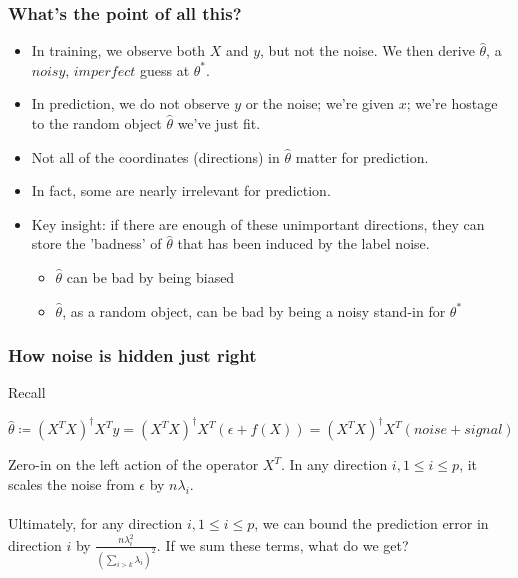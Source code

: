 \documentclass[pdf]{beamer}
\begin{document}
\begin{frame}

\frametitle{What's the point of all this?}

\begin{itemize}
    \item In training, we observe both $X$ and $y$, but not the noise.  We then derive $\hat\theta$, a $\textit{noisy, imperfect}$ guess at $\theta^{*}$.
    \item In prediction, we do not observe $y$ or the noise; we're given $x$; we're hostage to the random object $\hat\theta$ we've just fit.
\end{itemize}


\begin{itemize}
    \item<3-8> Not all of the coordinates (directions) in $\hat\theta$ matter for prediction.  
    \item<4-8> In fact, some are nearly irrelevant for prediction.  
    \item <5-8> Key insight: if there are enough of these unimportant directions, they can store the 'badness' of $\hat\theta$ that has been induced by the label noise.
    \begin{itemize}
        \item<6-8> $\hat\theta$ can be bad by being biased
        \item<7-8> $\hat\theta$, as a random object, can be bad by being a noisy stand-in for $\theta^{*}$
    \end{itemize}
\end{itemize}




\end{frame}


\begin{frame}
\frametitle{How noise is hidden just right}

Recall

\[ \hat\theta \coloneqq (X^{T}X)^{\dagger}X^{T}y =  (X^{T}X)^{\dagger}X^{T}(\epsilon + f(X)) = (X^{T}X)^{\dagger}X^{T}(noise + signal)\]

Zero-in on the left action of the operator $X^{T}$.  In any direction $i, 1\leq i \leq p$, it scales the noise from $\epsilon$ by $n\lambda_{i}$.\\~\\

Ultimately, for any direction $i, 1\leq i \leq p$, we can bound the prediction error in direction $i$ by $\frac{n\lambda_{i}^{2}}{(\sum_{i > k}\lambda_{i})^{2}}$.  If we sum these terms, what do we get?

\end{frame}
\end{document}
